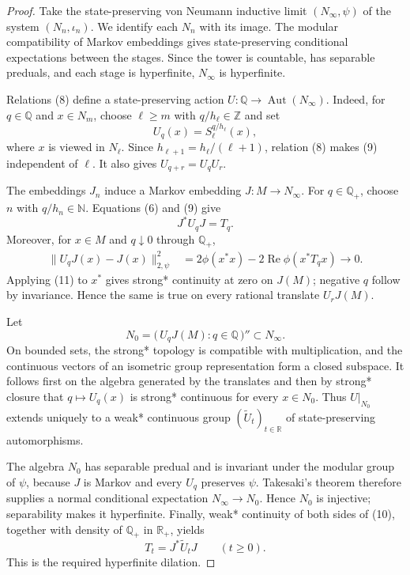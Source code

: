 \documentclass[11pt]{article}
\newcommand{\N}{\mathbb N}
\newcommand{\Q}{\mathbb Q}
\newcommand{\R}{\mathbb R}
\newcommand{\Aut}{\operatorname{Aut}}
\begin{document}
\begin{proof}
Take the state-preserving von Neumann inductive limit
$(N_\infty,\psi)$ of the system $(N_n,\iota_n)$.  We identify each $N_n$
with its image.  The modular compatibility of Markov embeddings gives
state-preserving conditional expectations between the stages.  Since the
tower is countable, has separable preduals, and each stage is hyperfinite,
$N_\infty$ is hyperfinite.

Relations (8) define a state-preserving action $U:\Q\to\Aut(N_\infty)$.
Indeed, for $q\in\Q$ and $x\in N_m$, choose
$\ell\geq m$ with $q/h_\ell\in\mathbb Z$ and set
\[
 U_q(x)=S_\ell^{q/h_\ell}(x),                     \tag{9}
\]
where $x$ is viewed in $N_\ell$.  Since
$h_{\ell+1}=h_\ell/(\ell+1)$, relation (8) makes (9) independent of
$\ell$.  It also gives $U_{q+r}=U_qU_r$.

The embeddings $J_n$ induce a Markov embedding $J:M\to N_\infty$.
For $q\in\Q_+$, choose $n$ with $q/h_n\in\N$.  Equations (6) and (9) give
\[
 J^*U_qJ=T_q.                                      \tag{10}
\]
Moreover, for $x\in M$ and $q\downarrow0$ through $\Q_+$,
\begin{align*}
 \|U_qJ(x)-J(x)\|_{2,\psi}^2
 &=2\phi(x^*x)-2\operatorname{Re}\phi(x^*T_qx)
 \longrightarrow0.                                \tag{11}
\end{align*}
Applying (11) to $x^*$ gives strong* continuity at zero on $J(M)$; negative
$q$ follow by invariance.  Hence the same is true on every rational translate
$U_rJ(M)$.

Let
\[
 N_0=\big(\,U_qJ(M):q\in\Q\,\big)''\subset N_\infty.
\]
On bounded sets, the strong* topology is compatible with multiplication,
and the continuous vectors of an isometric group representation form a
closed subspace.  It follows first on the algebra generated by the translates
and then by strong* closure that $q\mapsto U_q(x)$ is strong* continuous for
every $x\in N_0$.  Thus $U|_{N_0}$ extends uniquely to a weak* continuous
group $(\widetilde U_t)_{t\in\R}$ of state-preserving automorphisms.

The algebra $N_0$ has separable predual and is invariant under the modular
group of $\psi$, because $J$ is Markov and every $U_q$ preserves $\psi$.
Takesaki's theorem therefore supplies a normal conditional expectation
$N_\infty\to N_0$.  Hence $N_0$ is injective; separability makes it
hyperfinite.  Finally, weak* continuity of both sides of (10), together with
density of $\Q_+$ in $\R_+$, yields
\[
 T_t=J^*\widetilde U_tJ\qquad(t\geq0).
\]
This is the required hyperfinite dilation.
\end{proof}
\end{document}
